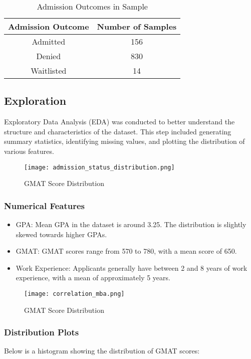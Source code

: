 \documentclass{article}
\begin{document}
\begin{table}[h]
\centering
\begin{tabular}{|c|c|}
\hline
Admission Outcome & Number of Samples \\
\hline
Admitted          & 156               \\
Denied            & 830               \\
Waitlisted        & 14                \\
\hline
\end{tabular}
\caption{Admission Outcomes in Sample}
\end{table}

\subsection{Exploration}

Exploratory Data Analysis (EDA) was conducted to better understand the structure and characteristics of the dataset. This step included generating summary statistics, identifying missing values, and plotting the distribution of various features.

\begin{figure}[h]
    \centering
    \texttt{[image: admission\_status\_distribution.png]}
    \caption{GMAT Score Distribution}
\end{figure}


\subsubsection{Numerical Features}
\begin{itemize}
    \item GPA: Mean GPA in the dataset is around 3.25. The distribution is slightly skewed towards higher GPAs.
    \item GMAT: GMAT scores range from 570 to 780, with a mean score of 650.
    \item Work Experience: Applicants generally have between 2 and 8 years of work experience, with a mean of approximately 5 years.
\end{itemize}

\begin{figure}[h]
    \centering
    \texttt{[image: correlation\_mba.png]}
    \caption{GMAT Score Distribution}
\end{figure}


\subsubsection{Distribution Plots}
Below is a histogram showing the distribution of GMAT scores:
\end{document}
